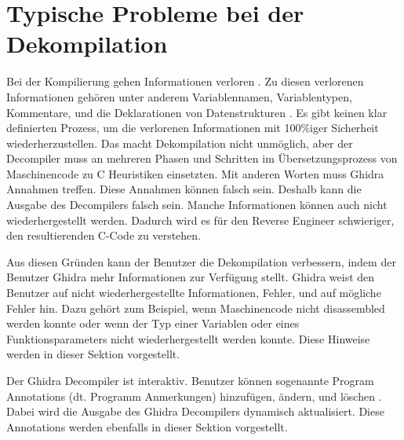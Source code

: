 





\section{Typische Probleme bei der Dekompilation}

Bei der Kompilierung gehen Informationen verloren \cite{12}. Zu diesen verlorenen Informationen gehören unter anderem Variablennamen, Variablentypen, Kommentare, und die Deklarationen von Datenstrukturen \cite{12}. Es gibt keinen klar definierten Prozess, um die verlorenen Informationen mit 100\%iger Sicherheit wiederherzustellen. Das macht Dekompilation nicht unmöglich, aber der Decompiler muss an mehreren Phasen und Schritten im Übersetzungsprozess von Maschinencode zu C Heuristiken einsetzten. Mit anderen Worten muss Ghidra Annahmen treffen. Diese Annahmen können falsch sein. Deshalb kann die Ausgabe des Decompilers falsch sein. Manche Informationen können auch nicht wiederhergestellt werden. Dadurch wird es für den Reverse Engineer schwieriger, den resultierenden C-Code zu verstehen.

Aus diesen Gründen kann der Benutzer die Dekompilation verbessern, indem der Benutzer Ghidra mehr Informationen zur Verfügung stellt. Ghidra weist den Benutzer auf nicht wiederhergestellte Informationen, Fehler, und auf mögliche Fehler hin. Dazu gehört zum Beispiel, wenn Maschinencode nicht disassembled werden konnte oder wenn der Typ einer Variablen oder eines Funktionsparameters nicht wiederhergestellt werden konnte. Diese Hinweise werden in dieser Sektion vorgestellt.

Der Ghidra Decompiler ist interaktiv. Benutzer können sogenannte Program Annotations (dt. Programm Anmerkungen) hinzufügen, ändern, und löschen \cite{1}. Dabei wird die Ausgabe des Ghidra Decompilers dynamisch aktualisiert. Diese Annotations werden ebenfalls in dieser Sektion vorgestellt. %


